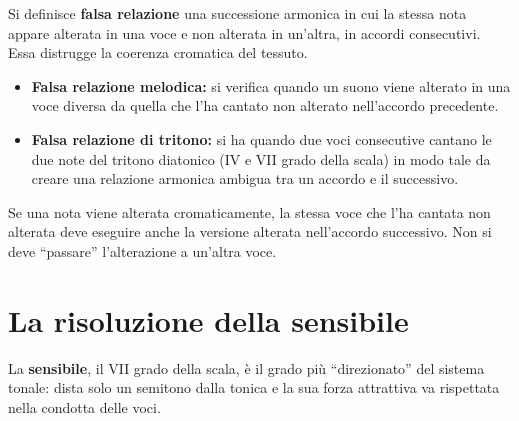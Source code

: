 \begin{definizione}
	\label{def:falsa_relazione}
	Si definisce \textbf{falsa relazione} una successione armonica in cui la stessa nota appare alterata in una voce e non alterata in un'altra, in accordi consecutivi. Essa distrugge la coerenza cromatica del tessuto.
	\begin{itemize}
		\item \textbf{Falsa relazione melodica:} si verifica quando un suono viene alterato in una voce diversa da quella che l'ha cantato non alterato nell'accordo precedente.
		\item \textbf{Falsa relazione di tritono:} si ha quando due voci consecutive cantano le due note del tritono diatonico (IV e VII grado della scala) in modo tale da creare una relazione armonica ambigua tra un accordo e il successivo.
	\end{itemize}
\end{definizione}

\begin{regola}
	\label{reg:evitare_falsa_relazione}
	Se una nota viene alterata cromaticamente, la stessa voce che l'ha cantata non alterata deve eseguire anche la versione alterata nell'accordo successivo. Non si deve ``passare'' l'alterazione a un'altra voce.
\end{regola}

\section{La risoluzione della sensibile}
\label{sec:risoluzione_sensibile}

La \textbf{sensibile}, il VII grado della scala, è il grado più ``direzionato'' del sistema tonale: dista solo un semitono dalla tonica e la sua forza attrattiva va rispettata nella condotta delle voci.

